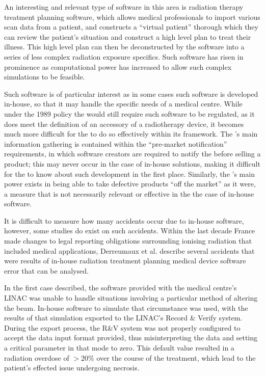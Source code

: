 \documentclass{cshonours}
\newcommand{\etal}{et al.\xspace}
\begin{document}
An interesting and relevant type of software in this area is radiation therapy treatment planning software, which allows medical professionals to import various scan data from a patient, and constructs a ``virtual patient'' thorough which they can review the patient's situation and construct a high level plan to treat their illness. This high level plan can then be deconstructed by the software into a series of less complex radiation exposure specifics. Such software has risen in prominence as computational power has increased to allow such complex simulations to be feasible.

Such software is of particular interest as in some cases such software is developed in-house, so that it may handle the specific needs of a medical centre. While under the 1989 policy the \fda would still require such software to be regulated, as it does meet the definition of an accessory of a radiotherapy device, it becomes much more difficult for the \fda to do so effectively within its framework. The \fda's main information gathering is contained within the ``pre-market notification'' requirements, in which software creators are required to notify the \fda before selling a product; this may never occur in the case of in-house solutions, making it difficult for the \fda to know about such development in the first place. Similarly, the \fda's main power exists in being able to take defective products ``off the market'' as it were, a measure that is not necessarily relevant or effective in the the case of in-house software.

It is difficult to measure how many accidents occur due to in-house software, however, some studies do exist on such accidents. Within the last decade France made changes to legal reporting obligations surrounding ionising radiation that included medical applications, Derreumaux \etal \cite{derreumaux2008lessons} describe several accidents that were results of in-house radiation treatment planning medical device software error that can be analysed.

In the first case described, the software provided with the medical centre's LINAC was unable to handle situations involving a particular method of altering the beam. In-house software to simulate that circumstance was used, with the results of that simulation exported to the LINAC's Record \& Verify system. During the export process, the R\&V system was not properly configured to accept the data input format provided, thus misinterpreting the data and setting a critical parameter in that mode to zero. This default value resulted in a radiation overdose of $>20\%$ over the course of the treatment, which lead to the patient's effected issue undergoing necrosis.
\end{document}
